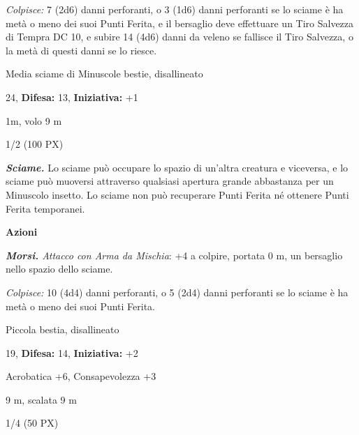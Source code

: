 \begin{multicols}{2}
{\emph{Colpisce:} 7 (2d6) danni perforanti, o 3 (1d6) danni perforanti se lo sciame è ha metà o meno dei suoi Punti Ferita, e il bersaglio deve effettuare un Tiro Salvezza di Tempra DC 10, e subire 14 (4d6) danni da veleno se fallisce il Tiro Salvezza, o la metà di questi danni se lo riesce.

\begin{description}[noitemsep, topsep=0pt, parsep=0pt, partopsep=0pt, leftmargin=0cm, labelwidth=2.2cm]
	\item[\textbf{Taglia/Tipo:}] Media sciame di Minuscole bestie, disallineato
	\item[\textbf{Caratt.:}] 
	\item[\textbf{Punti Ferita:}] 24,  \textbf{Difesa:} 13,  \textbf{Iniziativa:} +1
	\item[\textbf{Tiri Salvez.:}] 
	\item[\textbf{Movimento:}] 1m, volo 9 m
	\item[\textbf{Sfida:}] 1/2 (100 PX)\smallskip
\end{description}

\emph{\textbf{Sciame.}} Lo sciame può occupare lo spazio di un'altra creatura e viceversa, e lo sciame può muoversi attraverso qualsiasi apertura grande abbastanza per un Minuscolo insetto. Lo sciame non può recuperare Punti Ferita né ottenere Punti Ferita temporanei.

\textbf{Azioni}

\emph{\textbf{Morsi.} Attacco con Arma da Mischia}: +4 a colpire, portata 0 m, un bersaglio nello spazio dello sciame.

\emph{Colpisce:} 10 (4d4) danni perforanti, o 5 (2d4) danni perforanti se lo sciame è ha metà o meno dei suoi Punti Ferita.

\begin{description}[noitemsep, topsep=0pt, parsep=0pt, partopsep=0pt, leftmargin=0cm, labelwidth=2.2cm]
    \item[\textbf{Taglia/Tipo:}] Piccola bestia, disallineato
    \item[\textbf{Caratt.:}] 
    \item[\textbf{Punti Ferita:}] 19,  \textbf{Difesa:} 14,  \textbf{Iniziativa:} +2
    \item[\textbf{Comp.:}] Acrobatica +6, Consapevolezza +3
    \item[\textbf{Tiri Salvez.:}] 
    \item[\textbf{Movimento:}] 9 m, scalata 9 m
    \item[\textbf{Sfida:}] 1/4 (50 PX)\smallskip
\end{description}

}
\end{multicols}
